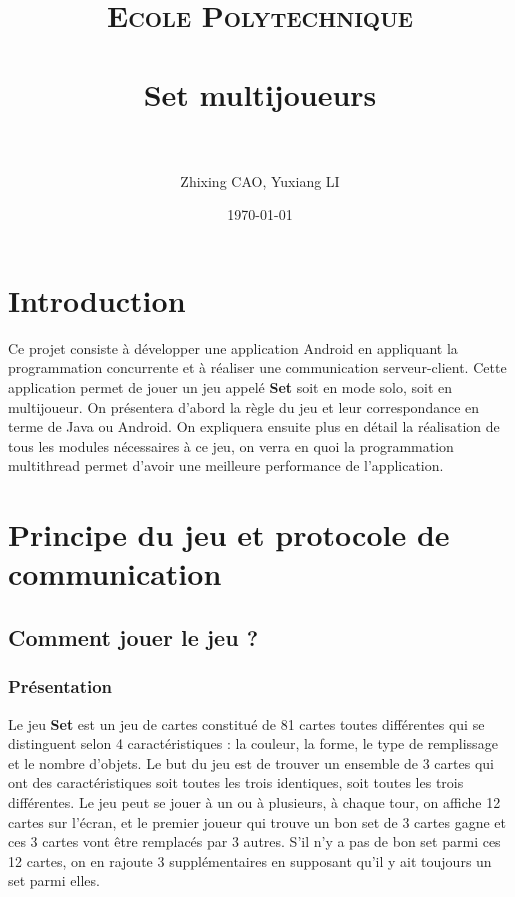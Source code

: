 \documentclass[paper=a4, french]{scrartcl} %
\title{	
\normalfont \normalsize 
\textsc{Ecole Polytechnique} \\ [25pt] %
\horrule{0.5pt} \\[0.5cm] %
\huge Set multijoueurs \\ %
\horrule{2pt} \\[0.5cm] %
}
\author{Zhixing CAO, Yuxiang LI} %
\date{\normalsize\today} %
\begin{document}
\setlength\parindent{12pt}

\maketitle %



\section{Introduction}

Ce projet consiste à développer une application Android en appliquant la programmation concurrente et à réaliser une communication serveur-client. Cette application permet de jouer un jeu appelé \textbf{Set} soit en mode solo, soit en multijoueur. On présentera d'abord la règle du jeu et leur correspondance en terme de Java ou Android. On expliquera ensuite plus en détail la réalisation de tous les modules nécessaires à ce jeu, on verra en quoi la programmation multithread permet d'avoir une meilleure performance de l'application.


\section{Principe du jeu et protocole de communication }

\subsection{Comment jouer le jeu ?}

\subsubsection{Présentation}
Le jeu \textbf{Set} est un jeu de cartes constitué de 81 cartes toutes différentes qui se distinguent selon 4 caractéristiques : la couleur, la forme, le type de remplissage et le nombre d'objets. Le but du jeu est de trouver un ensemble de 3 cartes qui ont des caractéristiques soit toutes les trois identiques, soit toutes les trois différentes. Le jeu peut se jouer à un ou à plusieurs, à chaque tour, on affiche 12 cartes sur l'écran, et le premier joueur qui trouve un bon set de 3 cartes gagne et ces 3 cartes vont être remplacés par 3 autres. S'il n'y a pas de bon set parmi ces 12 cartes, on en rajoute 3 supplémentaires en supposant qu'il y ait toujours un set parmi elles.
\end{document}
